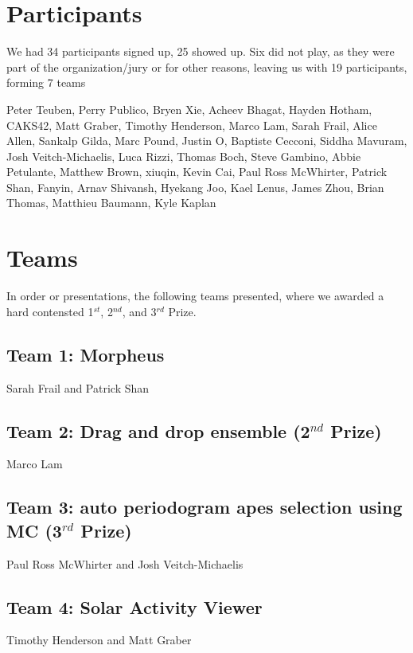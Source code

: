 \documentclass[11pt,twoside]{article}
\begin{document}
\section{Participants}

We had 34 participants signed up, 25 showed up.
Six did not play, as they were part of the organization/jury or for
other reasons, leaving us with 19 participants, forming 7 teams

Peter Teuben, 
Perry Publico, 
Bryen Xie, 
Acheev Bhagat, 
Hayden Hotham, 
CAKS42, 
Matt Graber, 
Timothy Henderson, 
Marco Lam, 
Sarah Frail, 
Alice Allen, 
Sankalp Gilda, 
Marc Pound, 
Justin O, 
Baptiste Cecconi, 
Siddha Mavuram, 
Josh Veitch-Michaelis, 
Luca Rizzi, 
Thomas Boch, 
Steve Gambino, 
Abbie Petulante, 
Matthew Brown, 
xiuqin, 
Kevin Cai, 
Paul Ross McWhirter, 
Patrick Shan, 
Fanyin, 
Arnav Shivansh, 
Hyekang Joo, 
Kael Lenus, 
James Zhou, 
Brian Thomas, 
Matthieu Baumann, 
Kyle Kaplan



\section{Teams}

In order or presentations, the following teams presented, where we awarded
a hard contensted 1$^{st}$, 2$^{nd}$, and 3$^{rd}$ Prize.

\subsection*{Team 1: Morpheus}
Sarah Frail and Patrick Shan

\subsection*{Team 2: Drag and drop ensemble (2$^{nd}$ Prize)}
Marco Lam

\subsection*{Team 3: auto periodogram apes selection using MC (3$^{rd}$ Prize)}

Paul Ross McWhirter and Josh Veitch-Michaelis

\subsection*{Team 4: Solar Activity Viewer}

Timothy Henderson and Matt Graber
\end{document}
